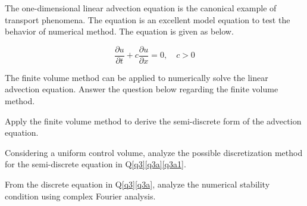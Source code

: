 \question{}\label{q3}

The one-dimensional linear advection equation is the canonical example of transport phenomena. The equation is an excellent model equation to test the behavior of numerical method. The equation is given as below.  
	
	
	\begin{equation}
	\frac{\partial u}{\partial t} + c \frac{\partial u}{\partial x} = 0, \quad c > 0 \nonumber
	\end{equation}		

\listbeginx	%

    \item \label{q3a} The finite volume method can be applied to numerically solve the linear advection equation. Answer the question below regarding the finite volume method.	

\listbegin
\item \label{q3a1} Apply the finite volume method to derive the semi-discrete form of the advection equation.



\item \label{q3a2} Considering a uniform control volume, analyze the possible discretization method for the semi-discrete equation in Q\ref{q3}\ref{q3a}\ref{q3a1}.



\listclose

		
	\item \label{q3b} From the discrete equation in Q\ref{q3}\ref{q3a}, analyze the numerical stability condition using complex Fourier analysis.   
	
